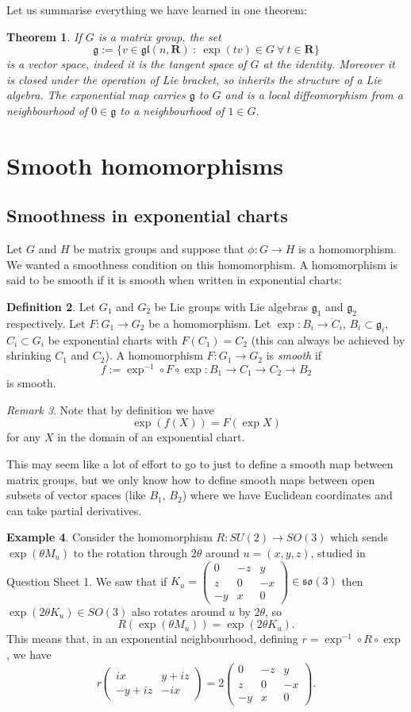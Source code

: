 \documentclass[12pt]{article}
\newcommand{\RR}{\mathbf{R}}
\newcommand{\matr}[4]{\left(\begin{array}{cc}#1 & #2\\ #3 & #4\end{array}\right)}
\newcommand{\matt}[9]{\left(\begin{array}{ccc}#1 & #2 & #3\\#4 & #5 & #6\\#7 & #8 & #9\end{array}\right)}
\newtheorem{thm}{Theorem}[section]
\theoremstyle{definition}
\newtheorem{dfn}[thm]{Definition}
\newtheorem{exm}[thm]{Example}
\theoremstyle{check}
\theoremstyle{remark}
\newtheorem{rmk}[thm]{Remark}
\theoremstyle{TheoremNum}
\begin{document}
Let us summarise everything we have learned in one theorem:

\begin{thm}
If $G$ is a matrix group, the set
\[\mathfrak{g}:=\{v\in\mathfrak{gl}(n,\RR)\ :\ \exp(tv)\in G\ \forall\ t\in\RR\}\]
is a vector space, indeed it is the tangent space of $G$ at the identity. Moreover it is closed under the operation of Lie bracket, so inherits the structure of a Lie algebra. The exponential map carries $\mathfrak{g}$ to $G$ and is a local diffeomorphism from a neighbourhood of $0\in\mathfrak{g}$ to a neighbourhood of $1\in G$.
\end{thm}

\section{Smooth homomorphisms}

\subsection{Smoothness in exponential charts}

Let $G$ and $H$ be matrix groups and suppose that $\phi\colon G\to H$ is a homomorphism. We wanted a smoothness condition on this homomorphism. A homomorphism is said to be smooth if it is smooth when written in exponential charts:

\begin{dfn}
Let $G_1$ and $G_2$ be Lie groups with Lie algebras $\mathfrak{g}_1$ and $\mathfrak{g}_2$ respectively. Let $F\colon G_1\to G_2$ be a homomorphism. Let $\exp\colon B_i\to C_i$, $B_i\subset\mathfrak{g}_i$, $C_i\subset G_i$ be exponential charts with $F(C_1)=C_2$ (this can always be achieved by shrinking $C_1$ and $C_2$). A homomorphism $F\colon G_1\to G_2$ is {\em smooth} if
\[f:=\exp^{-1}\circ F\circ\exp\colon B_1\to C_1\to C_2\to B_2\]
is smooth.
\end{dfn}

\begin{rmk}
Note that by definition we have
\[\exp(f(X))=F(\exp X)\]
for any $X$ in the domain of an exponential chart.
\end{rmk}

This may seem like a lot of effort to go to just to define a smooth map between matrix groups, but we only know how to define smooth maps between open subsets of vector spaces (like $B_1$, $B_2$) where we have Euclidean coordinates and can take partial derivatives.

\begin{exm}
Consider the homomorphism $R\colon SU(2)\to SO(3)$ which sends $\exp(\theta M_u)$ to the rotation through $2\theta$ around $u=(x,y,z)$, studied in Question Sheet 1. We saw that if $K_u=\matt{0}{-z}{y}{z}{0}{-x}{-y}{x}{0}\in\mathfrak{so}(3)$ then $\exp(2\theta K_u)\in SO(3)$ also rotates around $u$ by $2\theta$, so
\[R(\exp(\theta M_u))=\exp(2\theta K_u).\]
This means that, in an exponential neighbourhood, defining $r=\exp^{-1}\circ R\circ\exp$, we have
\[r\matr{ix}{y+iz}{-y+iz}{-ix}=2\matt{0}{-z}{y}{z}{0}{-x}{-y}{x}{0}.\]
\end{exm}
\end{document}
